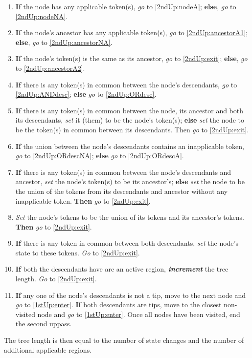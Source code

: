 \documentclass[a4paper,12pt]{article}
\begin{document}
\begin{enumerate}
    \item \label{2ndUp:enter} \textbf{If} the node has any applicable token(s), \textit{go} to \ref{2ndUp:nodeA}; \textbf{else}, \textit{go} to \ref{2ndUp:nodeNA}.
    \item \label{2ndUp:nodeA} \textbf{If} the node's ancestor has any applicable token(s), \textit{go} to \ref{2ndUp:ancestorA1}; \textbf{else}, \textit{go} to \ref{2ndUp:ancestorNA}.
    \item \label{2ndUp:ancestorA1} \textbf{If} the node's token(s) is the same as its ancestor, \textit{go} to \ref{2ndUp:exit}; \textbf{else}, \textit{go} to \ref{2ndUp:ancestorA2}.
    \item \label{2ndUp:ancestorA2} \textbf{If} there is any token(s) in common between the node's descendants, \textit{go} to \ref{2ndUp:ANDdesc}; \textbf{else} \textit{go} to \ref{2ndUp:ORdesc}.
    \item \label{2ndUp:ANDdesc} \textbf{If} there is any token(s) in common between the node, its ancestor and both its descendants, \textit{set} it (them) to be the node's token(s); \textbf{else} \textit{set} the node to be the token(s) in common between its descendants. Then \textit{go} to \ref{2ndUp:exit}.
    \item \label{2ndUp:ORdesc} \textbf{If} the union between the node's descendants contains an inapplicable token, \textit{go} to \ref{2ndUp:ORdescNA}; \textbf{else} \textit{go} to \ref{2ndUp:ORdescA}.
    \item \label{2ndUp:ORdescNA} \textbf{If} there is any token(s) in common between the node's descendants and ancestor, \textit{set} the node's token(s) to be its ancestor's; \textbf{else} \textit{set} the node to be the union of the tokens from its descendants and ancestor without any inapplicable token. \textbf{Then} \textit{go} to \ref{2ndUp:exit}.
    \item \label{2ndUp:ORdescA} \textit{Set} the node's tokens to be the union of its tokens and its ancestor's tokens. \textbf{Then} \textit{go} to \ref{2ndUp:exit}.
    \item \label{2ndUp:ancestorNA} \textbf{If} there is any token in common between both descendants, \textit{set} the node's state to these tokens. \textit{Go} to \ref{2ndUp:exit}. %
    \item \label{2ndUp:nodeNA} \textbf{If} both the descendants have are an active region, \textbf{\textit{increment}} the tree length. \textit{Go} to \ref{2ndUp:exit}. %
    \item \label{2ndUp:exit} \textbf{If} any one of the node's descendants is not a tip, move to the next node and \textit{go} to \ref{1stUp:enter}. \textbf{If} both descendants are tips, move to the closest non-visited node and \textit{go} to \ref{1stUp:enter}. Once all nodes have been visited, end the second uppass.
\end{enumerate}

The tree length is then equal to the number of state changes and the number of additional applicable regions.
\end{document}
